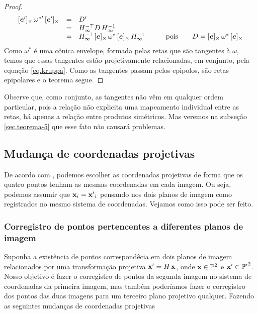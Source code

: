 \begin{proof}
\begin{equation}\label{eq.kruppa}
\begin{array}{rcll}
[\boldsymbol{e}']_\times\,{{\bf \omega}^*}'\,[\boldsymbol{e}']_\times&=&D'&\\
&=&H_\infty^{-\top}D\,H_\infty^{-1}&\\
&=&H_\infty^{-\top}[\boldsymbol{e}]_\times\,{\bf \omega}^*\,[\boldsymbol{e}]_\times\,H_\infty^{-1}&\qquad\text{pois}\qquad D=[\boldsymbol{e}]_\times\,{\bf \omega}^*\,[\boldsymbol{e}]_\times\\
\end{array}
\end{equation}
Como $\omega^*$ é uma cônica envelope, formada pelas retas que são tangentes à $\omega$, temos que essas tangentes estão projetivamente relacionadas, em conjunto, pela equação \ref{eq.kruppa}. Como as tangentes passam pelos epipolos, são retas epipolares e o teorema segue.

\end{proof}
Observe que, como conjunto, as tangentes não vêm em qualquer ordem particular, pois a relação não explicita uma mapeamento individual entre as retas, há apenas a relação entre produtos simétricos. Mas veremos na subseção \ref{sec.teorema-5} que esse fato não causará problemas.



\subsection{Mudança de coordenadas projetivas}

De acordo com \cite{kneebone}, podemos escolher as coordenadas projetivas de forma que os quatro pontos tenham as mesmas coordenadas em cada imagem. Ou seja, podemos assumir que ${\bf x}_i = {\bf x'}_i$ pensando nos dois planos de imagem como registrados no mesmo sistema de coordenadas. Vejamos como isso pode ser feito.

\subsubsection{Corregistro de pontos pertencentes a diferentes planos de imagem}\label{sec.corregistro-pontos}
Suponha a existência de pontos correspondêcia em dois planos de imagem relacionados por uma transformação projetiva $\mathbf{x}'=H\,\mathbf{x}$, onde $\mathbf{x}\in {\mathbb{P}^2}$ e $\mathbf{x}'\in {\mathbb{P'}^2}$. Nosso objetivo é fazer o corregistro de pontos da segunda imagem no sistema de coordenadas da primeira imagem, mas também poderíamos fazer o corregistro dos pontos das duas imagens para um terceiro plano projetivo qualquer. Fazendo as seguintes mudanças de coordenadas projetivas

